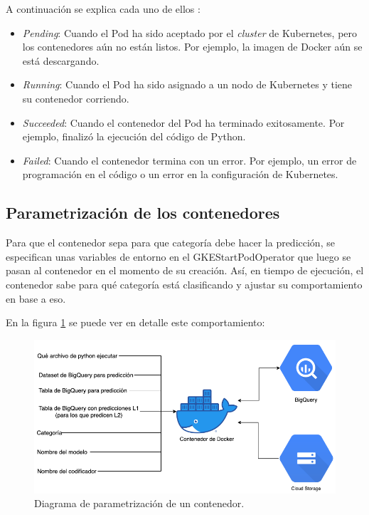 A continuación se explica cada uno de ellos \citep{WEBSITE:27}:
\begin{itemize}
	\item \textit{Pending}: Cuando el Pod ha sido aceptado por el \textit{cluster} de Kubernetes, pero los contenedores aún no están listos. Por ejemplo, la imagen de Docker aún se está descargando.
	\item \textit{Running}: Cuando el Pod ha sido asignado a un nodo de Kubernetes y tiene su contenedor corriendo.
	\item \textit{Succeeded}: Cuando el contenedor del Pod ha terminado exitosamente. Por ejemplo, finalizó la ejecución del código de Python.
	\item \textit{Failed}: Cuando el contenedor termina con un error. Por ejemplo, un error de programación en el código o un error en la configuración de Kubernetes.
\end{itemize}

\subsection{Parametrización de los contenedores}

Para que el contenedor sepa para que categoría debe hacer la predicción, se especifican unas variables de entorno en el GKEStartPodOperator que luego se pasan al contenedor en el momento de su creación. Así, en tiempo de ejecución, el contenedor sabe para qué categoría está clasificando y ajustar su comportamiento en base a eso.

En la figura \ref{fig:cap3-prediccion} se puede ver en detalle este comportamiento:

\begin{figure}[htbp]
	\centering
	\includegraphics[width=.8\textwidth]{./Figures/cap3-prediccion.png}
	\caption{Diagrama de parametrización de un contenedor.}
	\label{fig:cap3-prediccion}
\end{figure}

